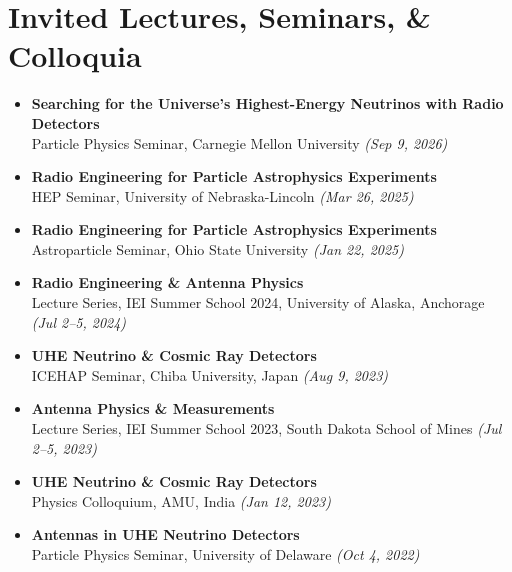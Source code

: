 \documentclass[10pt]{report}
\begin{document}
\section*{Invited Lectures, Seminars, \& Colloquia}
\begin{itemize}

    \item \textbf{Searching for the Universe's Highest-Energy Neutrinos with Radio Detectors}\\
    Particle Physics Seminar, Carnegie Mellon University \textit{(Sep 9, 2026)}

    \item \textbf{Radio Engineering for Particle Astrophysics Experiments}\\
    HEP Seminar, University of Nebraska-Lincoln \textit{(Mar 26, 2025)}
    
    \item \textbf{Radio Engineering for Particle Astrophysics Experiments} \\
    Astroparticle Seminar, Ohio State University \textit{(Jan 22, 2025)}
    
    \item \textbf{Radio Engineering \& Antenna Physics} \\
    Lecture Series, IEI Summer School 2024, University of Alaska, Anchorage \textit{(Jul 2--5, 2024)}
    
    \item \textbf{UHE Neutrino \& Cosmic Ray Detectors} \\
    ICEHAP Seminar, Chiba University, Japan \textit{(Aug 9, 2023)}
    
    \item \textbf{Antenna Physics \& Measurements} \\
    Lecture Series, IEI Summer School 2023, South Dakota School of Mines \textit{(Jul 2--5, 2023)}
    
    \item \textbf{UHE Neutrino \& Cosmic Ray Detectors} \\
    Physics Colloquium, AMU, India \textit{(Jan 12, 2023)}
    
    \item \textbf{Antennas in UHE Neutrino Detectors} \\
    Particle Physics Seminar, University of Delaware \textit{(Oct 4, 2022)}
\end{itemize}

\end{document}
